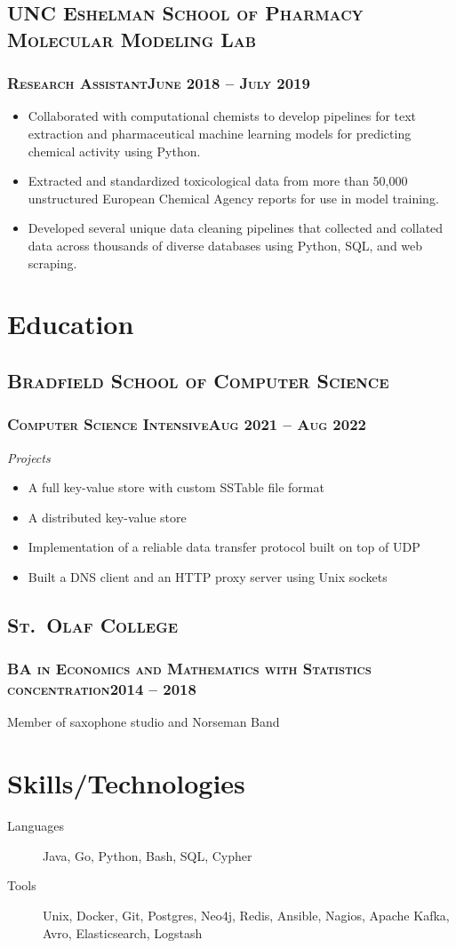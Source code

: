 \documentclass{article}
\newcommand{\resumeSection}[1]{\section*{#1}}
\newcommand{\institution}[1]{\subsection*{\scshape{#1}}}
\newcommand{\jobPosition}[3]{\subsubsection*{\scshape{#1}\hfill #2 -- #3}}
\begin{document}
  \institution{UNC Eshelman School of Pharmacy Molecular Modeling Lab}

    \jobPosition{Research Assistant}{June 2018}{July 2019}
    \begin{itemize}[noitemsep]
      \item
            Collaborated with computational chemists to develop
            pipelines for text extraction and pharmaceutical machine
            learning models for predicting chemical activity using Python.
      \item
            Extracted and standardized toxicological data from more
            than 50,000 unstructured European Chemical Agency reports
            for use in model training.
      \item
            Developed several unique data cleaning pipelines that
            collected and collated data across thousands of diverse
            databases using Python, SQL, and web scraping.
    \end{itemize}

\resumeSection{Education}
  \institution{Bradfield School of Computer Science}
    \jobPosition{Computer Science Intensive}{Aug 2021}{Aug 2022}
    \emph{Projects}
    \begin{itemize}[noitemsep]
      \item A full key-value store with custom SSTable file format
      \item A distributed key-value store
      \item Implementation of a reliable data transfer protocol built on top of UDP
      \item Built a DNS client and an HTTP proxy server using Unix sockets
    \end{itemize}

  \institution{St.\ Olaf College}
    \jobPosition{BA in Economics and Mathematics with Statistics concentration}{2014}{2018}
    Member of saxophone studio and Norseman Band

\resumeSection{Skills/Technologies}
  \begin{description}
          \item [Languages]
    Java,
    Go,
    Python,
    Bash,
    SQL,
    Cypher
          \item [Tools]
    Unix,
    Docker,
    Git,
    Postgres,
    Neo4j,
    Redis,
    Ansible,
    Nagios,
    Apache Kafka,
    Avro,
    Elasticsearch,
    Logstash
  \end{description}
\end{document}

